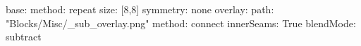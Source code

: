 base:
  method: repeat
  size: [8,8]
  symmetry: none
overlay:
  path: "Blocks/Misc/_sub_overlay.png"
  method: connect
  innerSeams: True
blendMode: subtract
